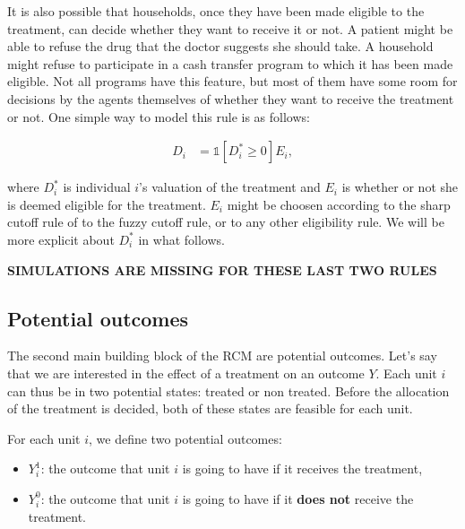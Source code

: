 \documentclass[]{book}
\providecommand{\tightlist}{%
  \setlength{\itemsep}{0pt}\setlength{\parskip}{0pt}}
\newcommand{\uns}[1]{\mathds{1}[ #1 ]}
\theoremstyle{definition}
\theoremstyle{definition}
\theoremstyle{definition}
\theoremstyle{remark}
\let\BeginKnitrBlock\begin \let\EndKnitrBlock\end
\begin{document}
It is also possible that households, once they have been made eligible
to the treatment, can decide whether they want to receive it or not. A
patient might be able to refuse the drug that the doctor suggests she
should take. A household might refuse to participate in a cash transfer
program to which it has been made eligible. Not all programs have this
feature, but most of them have some room for decisions by the agents
themselves of whether they want to receive the treatment or not. One
simple way to model this rule is as follows:

\begin{align}\label{eq:eligself}
  D_i & = \uns{D^*_i\geq0}E_i,
\end{align}

where \(D^*_i\) is individual \(i\)'s valuation of the treatment and
\(E_i\) is whether or not she is deemed eligible for the treatment.
\(E_i\) might be choosen according to the sharp cutoff rule of to the
fuzzy cutoff rule, or to any other eligibility rule. We will be more
explicit about \(D_i^*\) in what follows.

\textbf{SIMULATIONS ARE MISSING FOR THESE LAST TWO RULES}

\subsection{Potential outcomes}\label{potential-outcomes}

The second main building block of the RCM are potential outcomes. Let's
say that we are interested in the effect of a treatment on an outcome
\(Y\). Each unit \(i\) can thus be in two potential states: treated or
non treated. Before the allocation of the treatment is decided, both of
these states are feasible for each unit.

\BeginKnitrBlock{definition}[Potential outcomes]
\protect\hypertarget{def:unnamed-chunk-2}{}{\label{def:unnamed-chunk-2}
\iffalse (Potential outcomes) \fi{} }For each unit \(i\), we define two
potential outcomes:
\EndKnitrBlock{definition}

\begin{itemize}
\tightlist
\item
  \(Y_i^1\): the outcome that unit \(i\) is going to have if it receives
  the treatment,
\item
  \(Y_i^0\): the outcome that unit \(i\) is going to have if it
  \textbf{does not} receive the treatment.
\end{itemize}
\end{document}
